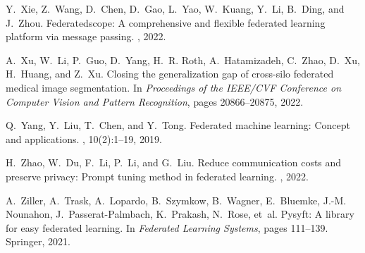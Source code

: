 \documentclass[11pt]{article}
\begin{document}
\begin{thebibliography}{10}
Y.~Xie, Z.~Wang, D.~Chen, D.~Gao, L.~Yao, W.~Kuang, Y.~Li, B.~Ding, and
  J.~Zhou.
\newblock Federatedscope: A comprehensive and flexible federated learning
  platform via message passing.
, 2022.

A.~Xu, W.~Li, P.~Guo, D.~Yang, H.~R. Roth, A.~Hatamizadeh, C.~Zhao, D.~Xu,
  H.~Huang, and Z.~Xu.
\newblock Closing the generalization gap of cross-silo federated medical image
  segmentation.
\newblock In {\em Proceedings of the IEEE/CVF Conference on Computer Vision and
  Pattern Recognition}, pages 20866--20875, 2022.

Q.~Yang, Y.~Liu, T.~Chen, and Y.~Tong.
\newblock Federated machine learning: Concept and applications.
,
  10(2):1--19, 2019.

H.~Zhao, W.~Du, F.~Li, P.~Li, and G.~Liu.
\newblock Reduce communication costs and preserve privacy: Prompt tuning method
  in federated learning.
, 2022.

A.~Ziller, A.~Trask, A.~Lopardo, B.~Szymkow, B.~Wagner, E.~Bluemke, J.-M.
  Nounahon, J.~Passerat-Palmbach, K.~Prakash, N.~Rose, et~al.
\newblock Pysyft: A library for easy federated learning.
\newblock In {\em Federated Learning Systems}, pages 111--139. Springer, 2021.

\end{thebibliography}








\end{document}
